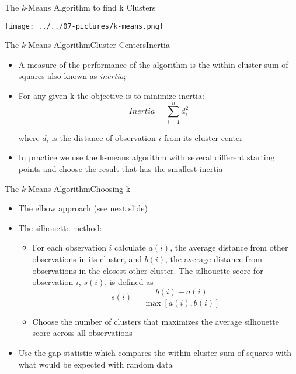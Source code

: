 \documentclass[11pt]{beamer}
\begin{document}
\begin{frame}{The \textit{k}-Means Algorithm to find k Clusters}
	\begin{center}
	\texttt{[image: ../../07-pictures/k-means.png]}
	\end{center}
\end{frame}
\begin{frame}{The \textit{k}-Means Algorithm}{Cluster Centers}{Inertia}
	\begin{itemize}
	\item A measure of the performance of the algorithm is the within cluster sum of squares also known as \textit{inertia};
		\item For any given k the objective is to minimize inertia:
		\begin{equation}
		Inertia = \sum\limits_{i=1}^n d_i^2
		\end{equation}
		
		where $d_i$ is the distance of observation $i$ from its cluster center
		\item In practice we use the k-means algorithm with several different starting points and choose the result that has the smallest inertia 
	\end{itemize}
\end{frame}
\begin{frame}{The \textit{k}-Means Algorithm}{Choosing k}
	\begin{itemize}
		\item The elbow approach (see next slide) 
		\item The silhouette method:
		\begin{itemize}
		\item For each observation $i$ calculate $a(i)$, the average distance from other observations in its cluster, and $b(i)$, the average distance from observations in the closest other cluster. The silhouette score for observation $i$, $s(i)$, is defined as 
		\begin{equation}
		s(i) = \frac{b(i)-a(i)}{\max[a(i),b(i)]}
\end{equation}		   
		\item Choose the number of clusters that maximizes the average silhouette score across all observations   

\end{itemize}		 
		\item Use the gap statistic which compares the within cluster sum of squares with what would be expected with random data
	\end{itemize}
\end{frame}
\end{document}
